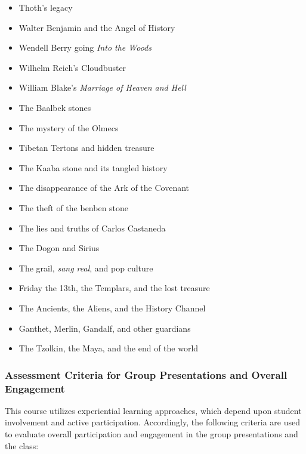 \documentclass[letterpaper,10pt,headsepline]{scrreprt}
\begin{document}
\begin{itemize}
\item Thoth's legacy
\item Walter Benjamin and the Angel of History
\item Wendell Berry going \textit{Into the Woods}
\item Wilhelm Reich's Cloudbuster
\item William Blake's \textit{Marriage of Heaven and Hell}
\item The Baalbek stones
\item The mystery of the Olmecs
\item Tibetan Tertons and hidden treasure
\item The Kaaba stone and its tangled history
\item The disappearance of the Ark of the Covenant
\item The theft of the benben stone
\item The lies and truths of Carlos Castaneda
\item The Dogon and Sirius
\item The grail, \textit{sang real}, and pop culture
\item Friday the 13th, the Templars, and the lost treasure 
\item The Ancients, the Aliens, and the History Channel
\item Ganthet, Merlin, Gandalf, and other guardians
\item The Tzolkin, the Maya, and the end of the world

\end{itemize}

\subsubsection{Assessment Criteria for Group Presentations and Overall Engagement}

This course utilizes experiential learning approaches, which depend upon student involvement and active participation. Accordingly, the following criteria are used to evaluate overall participation and engagement in the group presentations and the class:
\end{document}
